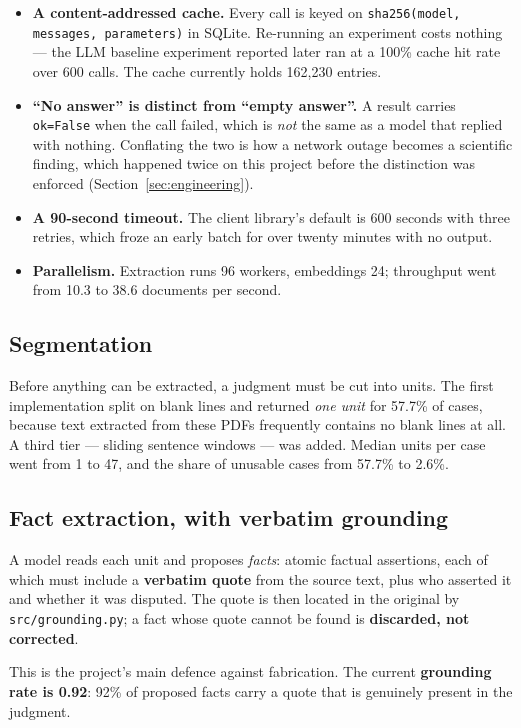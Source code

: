 \documentclass[12pt,a4paper]{article}
\newcommand{\code}[1]{\texttt{\small #1}}
\begin{document}
\begin{itemize}
\item \textbf{A content-addressed cache.} Every call is keyed on
\code{sha256(model, messages, parameters)} in SQLite. Re-running an experiment costs nothing --- the
LLM baseline experiment reported later ran at a 100\% cache hit rate over 600 calls. The cache
currently holds 162,230 entries.
\item \textbf{``No answer'' is distinct from ``empty answer''.} A result carries
\code{ok=False} when the call failed, which is \emph{not} the same as a model that replied with
nothing. Conflating the two is how a network outage becomes a scientific finding, which happened
twice on this project before the distinction was enforced (Section~\ref{sec:engineering}).
\item \textbf{A 90-second timeout.} The client library's default is 600 seconds with three
retries, which froze an early batch for over twenty minutes with no output.
\item \textbf{Parallelism.} Extraction runs 96 workers, embeddings 24; throughput went from 10.3 to
38.6 documents per second.
\end{itemize}

\subsection{Segmentation}

Before anything can be extracted, a judgment must be cut into units. The first implementation split
on blank lines and returned \emph{one unit} for 57.7\% of cases, because text extracted from these
PDFs frequently contains no blank lines at all. A third tier --- sliding sentence windows --- was
added. Median units per case went from 1 to 47, and the share of unusable cases from 57.7\% to
2.6\%.

\subsection{Fact extraction, with verbatim grounding}

A model reads each unit and proposes \emph{facts}: atomic factual assertions, each of which must
include a \textbf{verbatim quote} from the source text, plus who asserted it and whether it was
disputed. The quote is then located in the original by
\code{src/grounding.py}; a fact whose quote cannot be found is \textbf{discarded, not corrected}.

This is the project's main defence against fabrication. The current \textbf{grounding rate is
0.92}: 92\% of proposed facts carry a quote that is genuinely present in the judgment.
\end{document}
